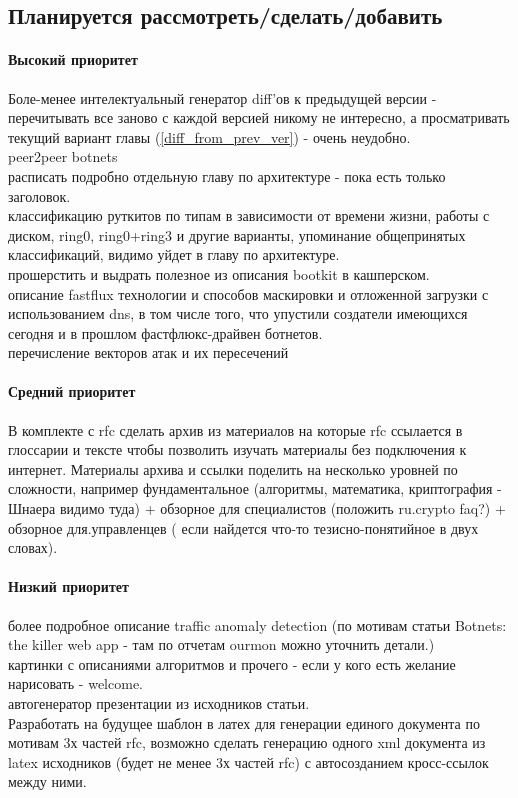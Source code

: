 \subsection{Планируется рассмотреть/сделать/добавить}
\label{paper_2do_2}

\paragraph{Высокий приоритет\\}
Боле-менее интелектуальный генератор diff'ов к предыдущей версии - перечитывать
все заново с каждой версией никому не интересно, а просматривать текущий вариант
главы (\ref{diff_from_prev_ver}) - очень неудобно.\\
peer2peer botnets\\
расписать подробно отдельную главу по архитектуре - пока есть только заголовок.\\
классификацию руткитов по типам в зависимости от времени жизни, работы с диском, ring0, ring0+ring3 и другие варианты, упоминание общепринятых классификаций, видимо уйдет в главу по архитектуре.\\
прошерстить и выдрать полезное из описания bootkit в кашперском.\\
описание fastflux технологии и способов маскировки и отложенной загрузки с использованием dns, в том числе того,
что упустили создатели имеющихся сегодня и в прошлом фастфлюкс-драйвен ботнетов.\\
перечисление векторов атак и их пересечений\\

\paragraph{Средний приоритет\\}
В комплекте с rfc сделать архив из материалов на которые rfc ссылается в глоссарии и тексте чтобы
позволить изучать материалы без подключения к интернет. Материалы архива и ссылки поделить на несколько
уровней по сложности, например фундаментальное (алгоритмы, математика, криптография - Шнаера видимо туда)
 + обзорное для специалистов (положить ru.crypto faq?) + обзорное для.управленцев
( если найдется что-то тезисно-понятийное в двух словах).

\paragraph{Низкий приоритет\\}
более подробное описание traffic anomaly detection (по мотивам статьи Botnets: the killer web app
- там по отчетам ourmon можно уточнить детали.)\\
картинки с описаниями алгоритмов и прочего - если у кого есть желание нарисовать - welcome.\\
автогенератор презентации из исходников статьи.\\
Разработать на будущее шаблон в латех для генерации единого документа по мотивам 3х частей rfc,
возможно сделать генерацию одного xml документа из latex исходников (будет не менее 3х частей rfc)
 с автосозданием кросс-ссылок между ними.


